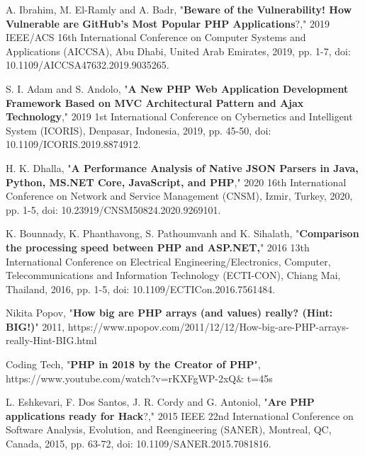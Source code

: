 \documentclass[12pt]{report}
\renewcommand{\_}{\kern-1.5pt\textunderscore\kern-1.5pt}
\begin{document}
\begin{multicols}{2}
\begin{thebibliography}{99}
{\fontsize{8pt}{9.6pt}\selectfont \textcolor[HTML]{222222}{A. Ibrahim, M. El-Ramly and A. Badr, "\textbf{Beware of the Vulnerability! How Vulnerable are GitHub's Most Popular PHP Applications}?," 2019 IEEE/ACS 16th International Conference on Computer Systems and Applications (AICCSA), Abu Dhabi, United Arab Emirates, 2019, pp. 1-7, doi: 10.1109/AICCSA47632.2019.9035265.}\par}
{\fontsize{8pt}{9.6pt}\selectfont \textcolor[HTML]{222222}{S. I. Adam and S. Andolo, "\textbf{A New PHP Web Application Development Framework Based on MVC Architectural Pattern and Ajax Technology}," 2019 1st International Conference on Cybernetics and Intelligent System (ICORIS), Denpasar, Indonesia, 2019, pp. 45-50, doi: 10.1109/ICORIS.2019.8874912.}\par}
{\fontsize{8pt}{9.6pt}\selectfont \textcolor[HTML]{222222}{H. K. Dhalla, "\textbf{A Performance Analysis of Native JSON Parsers in Java, Python, MS.NET Core, JavaScript, and PHP}," 2020 16th International Conference on Network and Service Management (CNSM), Izmir, Turkey, 2020, pp. 1-5, doi: 10.23919/CNSM50824.2020.9269101.}\par}
{\fontsize{8pt}{9.6pt}\selectfont \textcolor[HTML]{222222}{K. Bounnady, K. Phanthavong, S. Pathoumvanh and K. Sihalath, "\textbf{Comparison the processing speed between PHP and ASP.NET,}" 2016 13th International Conference on Electrical Engineering/Electronics, Computer, Telecommunications and Information Technology (ECTI-CON), Chiang Mai, Thailand, 2016, pp. 1-5, doi: 10.1109/ECTICon.2016.7561484.}\par}
{\fontsize{8pt}{9.6pt}\selectfont \textcolor[HTML]{222222}{Nikita Popov, "\textbf{How big are PHP arrays (and values) really? (Hint: BIG!)}" 2011, https://www.npopov.com/2011/12/12/How-big-are-PHP-arrays-really-Hint-BIG.html }\par}
{\fontsize{8pt}{9.6pt}\selectfont \textcolor[HTML]{222222}{Coding Tech, "\textbf{PHP in 2018 by the Creator of PHP}", https://www.youtube.com/watch?v=rKXFgWP-2xQ$\&$ t=45s}\par}
{\fontsize{8pt}{9.6pt}\selectfont \textcolor[HTML]{222222}{L. Eshkevari, F. Dos Santos, J. R. Cordy and G. Antoniol, "\textbf{Are PHP applications ready for Hack}?," 2015 IEEE 22nd International Conference on Software Analysis, Evolution, and Reengineering (SANER), Montreal, QC, Canada, 2015, pp. 63-72, doi: 10.1109/SANER.2015.7081816.}\par}
\end{thebibliography}

\vspace{\baselineskip}

\end{multicols}
\end{document}
